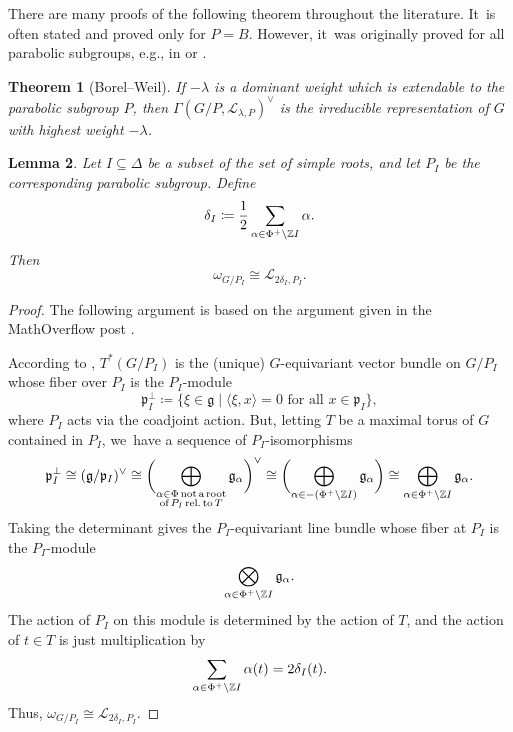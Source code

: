 \documentclass[11pt]{article}
\newcommand{\eg}{e.g.,\xspace}
\newtheorem{thm}{Theorem}[section]
\newtheorem{lem}[thm]{Lemma}
\begin{document}
There are many proofs of the following theorem throughout the literature. It~is often stated and proved only for $P=B$. However, it~was originally proved for all parabolic subgroups, \eg in \cite{Ser54} or \cite[Cor.\,to Th.\,V]{Bot57}.

\begin{thm}[Borel--Weil]\label{th:borel-weil}
If $-\lambda$ is a dominant weight which is extendable to the parabolic subgroup $P$, then $\Gamma(G/P,\mathscr{L}_{\lambda, P})^\vee$ is the irreducible representation of $G$ with highest weight $-\lambda$.
\end{thm}

\begin{lem}\label{can-as-char}
Let $I\subseteq \Delta$ be a subset of the set of simple roots, and let $P_I$ be the corresponding parabolic subgroup. Define
\begin{equation*}
\delta_I \coloneqq \frac{1}{2}\sum_{\alpha\in \Phi^+\setminus {\mathbb Z} I} \alpha.
\end{equation*}
Then
\begin{equation*}
\omega_{G/P_I} \cong \mathscr{L}_{2\delta_I, P_I}.
\end{equation*}
\end{lem}

\begin{proof}
The following argument is based on the argument given in the MathOverflow post \cite{403574}.

According to \cite[Lem.\,1.4.9]{CG10}, $T^*(G/P_I)$ is the (unique) $G$-equivariant vector bundle on $G/P_I$ whose fiber over $P_I$ is the $P_I$\nobreakdash-mod\-ule
\[
\mathfrak{p}_I^\perp\coloneqq \{\xi \in \mathfrak{g} \mid \langle \xi, x\rangle = 0 \text{ for all }x\in \mathfrak{p}_I\},
\]
where $P_I$ acts via the coadjoint action.
But, letting $T$ be a maximal torus of $G$ contained in $P_I$, we~have a sequence of $P_I$-isomorphisms
\begin{align*}
\mathfrak{p}_I^\perp \cong (\mathfrak{g}/\mathfrak{p}_I)^\vee
\cong \biggl(\bigoplus_{\substack{\alpha\in \Phi\text{\,not\,a\,root}\\\text{of\,}P_I\text{\,rel.\,to\,}T}}\mathfrak{g}_\alpha\biggr)^\vee
\cong \biggl(\bigoplus_{\alpha\in -(\Phi^+\setminus {\mathbb Z} I)} \mathfrak{g}_\alpha\biggr)
\cong \bigoplus_{\alpha\in \Phi^+\setminus {\mathbb Z} I} \mathfrak{g}_\alpha.
\end{align*}
Taking the determinant gives the $P_I$-equivariant line bundle whose fiber at $P_I$ is the $P_I$\nobreakdash-mod\-ule
\begin{equation*}
\bigotimes_{\alpha\in \Phi^+\setminus {\mathbb Z} I} \mathfrak{g}_\alpha.
\end{equation*}
The action of $P_I$ on this module is determined by the action of $T$, and the action of $t\in T$ is just multiplication by
\[
\sum_{\alpha \in \Phi^+\setminus {\mathbb Z} I} \alpha(t) = 2\delta_I(t).
\]
Thus, $\omega_{G/P_I} \cong \mathscr{L}_{2\delta_I, P_I}$.
\end{proof}
\end{document}
